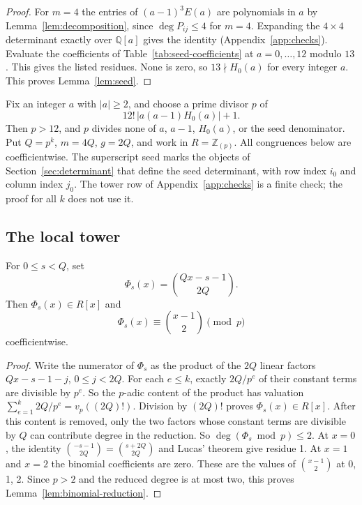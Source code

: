 \begin{proof}
For \(m=4\) the entries of \((a-1)^3E(a)\) are polynomials in \(a\) by Lemma~\ref{lem:decomposition}, since \(\deg P_{ij}\le4\) for \(m=4\). Expanding the \(4\times4\) determinant exactly over \(\mathbb Q[a]\) gives the identity (Appendix~\ref{app:checks}). Evaluate the coefficients of Table~\ref{tab:seed-coefficients} at \(a=0,\ldots,12\) modulo \(13\). This gives the listed residues. None is zero, so \(13\nmid H_0(a)\) for every integer \(a\). This proves Lemma~\ref{lem:seed}.
\end{proof}

Fix an integer \(a\) with \(|a|\ge2\), and choose a prime divisor \(p\) of
\[
 12!\,|a(a-1)H_0(a)|+1.
\]
Then \(p>12\), and \(p\) divides none of \(a\), \(a-1\), \(H_0(a)\), or the seed denominator. Put \(Q=p^k\), \(m=4Q\), \(g=2Q\), and work in \(R={\mathbb Z}_{(p)}\). All congruences below are coefficientwise. The superscript seed marks the objects of Section~\ref{sec:determinant} that define the seed determinant, with row index \(i_0\) and column index \(j_0\). The tower row of Appendix~\ref{app:checks} is a finite check; the proof for all \(k\) does not use it.

\subsection{The local tower}\label{subsec:tower}

\begin{lemma}\label{lem:binomial-reduction}
For \(0\le s<Q\), set
\[
 \Phi_s(x)=\binom{Qx-s-1}{2Q}.
\]
Then \(\Phi_s(x)\in R[x]\) and
\[
 \Phi_s(x)\equiv\binom{x-1}{2}\pmod p
\]
coefficientwise.
\end{lemma}

\begin{proof}
Write the numerator of \(\Phi_s\) as the product of the \(2Q\) linear factors \(Qx-s-1-j\), \(0\le{}j<2Q\). For each \(e\le{}k\), exactly \(2Q/p^e\) of their constant terms are divisible by \(p^e\). So the \(p\)-adic content of the product has valuation \(\sum_{e=1}^k 2Q/p^e=v_p((2Q)!)\). Division by \((2Q)!\) proves \(\Phi_s(x)\in R[x]\). After this content is removed, only the two factors whose constant terms are divisible by \(Q\) can contribute degree in the reduction. So \(\deg(\Phi_s \bmod p)\le2\). At \(x=0\), the identity \(\binom{-s-1}{2Q}=\binom{s+2Q}{2Q}\) and Lucas' theorem give residue 1. At \(x=1\) and \(x=2\) the binomial coefficients are zero. These are the values of \(\binom{x-1}{2}\) at 0, 1, 2. Since \(p>2\) and the reduced degree is at most two, this proves Lemma~\ref{lem:binomial-reduction}.
\end{proof}

